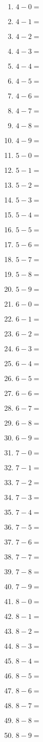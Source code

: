 \documentclass{article}
\begin{document}
\begin{multicols}{5}
\begin{enumerate}
\item $4 - 0 =$
\item $4 - 1 =$
\item $4 - 2 =$
\item $4 - 3 =$
\item $4 - 4 =$
\item $4 - 5 =$
\item $4 - 6 =$
\item $4 - 7 =$
\item $4 - 8 =$
\item $4 - 9 =$

\item $5 - 0 =$
\item $5 - 1 =$
\item $5 - 2 =$
\item $5 - 3 =$
\item $5 - 4 =$
\item $5 - 5 =$
\item $5 - 6 =$
\item $5 - 7 =$
\item $5 - 8 =$
\item $5 - 9 =$

\item $6 - 0 =$
\item $6 - 1 =$
\item $6 - 2 =$
\item $6 - 3 =$
\item $6 - 4 =$
\item $6 - 5 =$
\item $6 - 6 =$
\item $6 - 7 =$
\item $6 - 8 =$
\item $6 - 9 =$

\item $7 - 0 =$
\item $7 - 1 =$
\item $7 - 2 =$
\item $7 - 3 =$
\item $7 - 4 =$
\item $7 - 5 =$
\item $7 - 6 =$
\item $7 - 7 =$
\item $7 - 8 =$
\item $7 - 9 =$

\item $8 - 0 =$
\item $8 - 1 =$
\item $8 - 2 =$
\item $8 - 3 =$
\item $8 - 4 =$
\item $8 - 5 =$
\item $8 - 6 =$
\item $8 - 7 =$
\item $8 - 8 =$
\item $8 - 9 =$


\end{enumerate}
\end{multicols}
\end{document}

